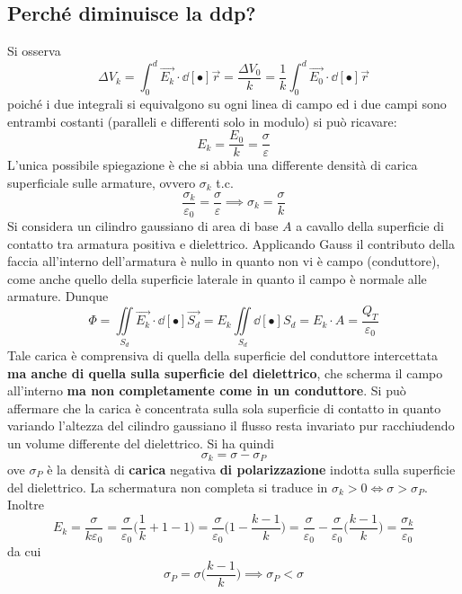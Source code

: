 \subsection{Perché diminuisce la ddp?}
Si osserva
\[\Delta V_k = \int_0^d \vec{E_k} \cdot \dd[•]{\vec{r}} = \frac{\Delta V_0}{k} = \frac{1}{k} \int_0^d \vec{E_0} \cdot \dd[•]{\vec{r}}\]
poiché i due integrali si equivalgono su ogni linea di campo ed i due campi sono entrambi costanti (paralleli e differenti solo in modulo) si può ricavare:
\[E_k = \frac{E_0}{k} = \frac{\sigma}{\varepsilon}\]
L'unica possibile spiegazione è che si abbia una differente densità di carica superficiale sulle armature, ovvero $\sigma_k$ t.c.
\[\frac{\sigma_k}{\varepsilon_0} = \frac{\sigma}{\varepsilon} \implies \sigma_k = \frac{\sigma}{k}\]
Si considera un cilindro gaussiano di area di base $A$ a cavallo della superficie di contatto tra armatura positiva e dielettrico. Applicando Gauss il contributo della faccia all'interno dell'armatura è nullo in quanto non vi è campo (conduttore), come anche quello della superficie laterale in quanto il campo è normale alle armature. Dunque
\[\Phi = \iint\limits_{S_d} \vec{E_k} \cdot \dd[•]{\vec{S_d}} = E_k \iint\limits_{S_d} \dd[•]{S_d} = E_k \cdot A = \frac{Q_T}{\varepsilon_0}\]
Tale carica è comprensiva di quella della superficie del conduttore intercettata \textbf{ma anche di quella sulla superficie del dielettrico}, che scherma il campo all'interno \textbf{ma non completamente come in un conduttore}. Si può affermare che la carica è concentrata sulla sola superficie di contatto in quanto variando l'altezza del cilindro gaussiano il flusso resta invariato pur racchiudendo un volume differente del dielettrico. Si ha quindi
\[\sigma_k = \sigma - \sigma_P\]
ove $\sigma_P$ è la densità di \textbf{carica} negativa \textbf{di polarizzazione} indotta sulla superficie del dielettrico. La schermatura non completa si traduce in $\sigma_k > 0 \Longleftrightarrow \sigma > \sigma_P$. Inoltre
\[E_k = \frac{\sigma}{k \varepsilon_0} = \frac{\sigma}{\varepsilon_0} \big(\frac{1}{k} + 1 - 1\big) = \frac{\sigma}{\varepsilon_0} \big(1 - \frac{k-1}{k}\big) = \frac{\sigma}{\varepsilon_0} - \frac{\sigma}{\varepsilon_0}\big(\frac{k-1}{k}\big) = \frac{\sigma_k}{\varepsilon_0}\]
da cui
\[\sigma_P = \sigma \big(\frac{k-1}{k}\big) \implies \sigma_P < \sigma\]


